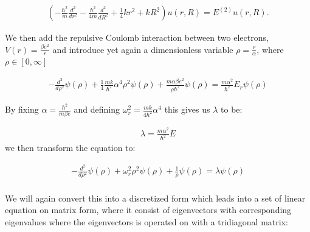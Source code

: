 \documentclass[twoside,onecolumn]{article}
\begin{document}
\begin{align*}
\left(  -\frac{\hbar^2}{m} \frac{d^2}{dr^2} -\frac{\hbar^2}{4m} \frac{d^2}{dR^2}+ \frac{1}{4}k r^2+ kR^2 \right)u(r,R)  = E^{(2)} u(r,R) .
\end{align*}

We then add the repulsive Coulomb interaction between two electrons, $V(r) = \frac{\beta e^2}{r}$ and introduce yet again a dimensionless variable $\rho = \frac{r}{\alpha}$, where  
$\rho\in[0,\infty]$


\begin{align*}
-\frac{d^2}{d\rho^2} \psi(\rho) + \frac{1}{4}\frac{mk}{\hbar^2} \alpha^4\rho^2\psi(\rho)+\frac{m\alpha \beta e^2}{\rho\hbar^2}\psi(\rho)  = \frac{m\alpha^2}{\hbar^2}E_r \psi(\rho)
\end{align*}

By fixing $\alpha = \frac{\hbar^2}{m\beta e}$ and defining $\omega_r^2 = \frac{mk}{4\hbar^2}\alpha^4$ this gives us $\lambda$ to be:

\begin{align*}
\lambda = \frac{m\alpha^2}{\hbar^2}E
\end{align*}
we then transform the equation to: 

\begin{align}
-\frac{d^2}{d\rho^2} \psi(\rho) + \omega_r^2\rho^2\psi(\rho) +\frac{1}{\rho}\psi(\rho)  = \lambda \psi(\rho)
\end{align}
\\

We will again convert this into a discretized form which leads into a set of linear equation on matrix form, where it consist of eigenvectors with corresponding eigenvalues where the eigenvectors is operated on with a tridiagonal matrix:
\end{document}
